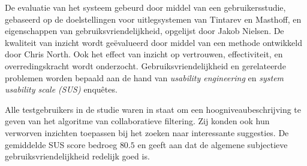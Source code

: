 De evaluatie van het systeem gebeurd door middel van een gebruikersstudie, gebaseerd op de doelstellingen voor uitlegsystemen van Tintarev en Masthoff\cite{tintarev:2007:SER:1547550.1547664}, en eigenschappen van gebruiksvriendelijkheid, opgelijst door Jakob Nielsen\cite{nielsen:1993:UE:529793}. De kwaliteit van inzicht wordt ge\"evalueerd door middel van een methode ontwikkeld door Chris North\cite{north:2006}. Ook het effect van inzicht op vertrouwen, effectiviteit, en overredingskracht wordt onderzocht. Gebruiksvriendelijkheid en gerelateerde problemen worden bepaald aan de hand van \emph{usability engineering} en \emph{system usability scale (SUS)} enqu\^etes.



Alle testgebruikers in de studie waren in staat om een hoogniveaubeschrijving te geven van het algoritme van collaboratieve filtering. Zij konden ook hun verworven inzichten toepassen bij het zoeken naar interessante suggesties. De gemiddelde SUS score bedroeg $80.5$ en geeft aan dat de algemene subjectieve gebruiksvriendelijkheid redelijk goed is.



